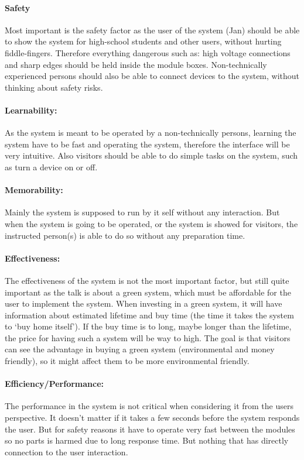 \paragraph{Safety}
Most important is the safety factor as the user of the system (Jan) should be able to show the system for high-school students and other users, without hurting fiddle-fingers. Therefore everything dangerous such as: high voltage connections and sharp edges should be held inside the module boxes.
Non-technically experienced persons should also be able to connect devices to the system, without thinking about safety risks. 
\paragraph{Learnability:}
As the system is meant to be operated by a non-technically persons, learning the system have to be fast and operating the system, therefore the interface will be very intuitive.
Also visitors should be able to do simple tasks on the system, such as turn a device on or off.
\paragraph{Memorability:}
Mainly the system is supposed to run by it self without any interaction. But when the system is going to be operated, or the system is showed for visitors, the instructed person(s) is able to do so without any preparation time.
\paragraph{Effectiveness:}
The effectiveness of the system is not the most important factor, but still quite important as the talk is about a green system, which must be
affordable for the user to implement the system. When investing in a green system, it will have information about estimated lifetime and buy time (the time it takes the system to `buy home itself'). If the buy time is to long, maybe longer than the lifetime, the price for having such a system will be way to high. The goal is that visitors can see the advantage in buying a green system (environmental and money friendly), so it might affect them to be more environmental friendly. 
\paragraph{Efficiency/Performance:}
The performance in the system is not critical when considering it from the users perspective. It doesn't matter if it takes a few seconds before the system responds the user. But for safety reasons it have to operate very fast between the modules so no parts is harmed due to long response time. But nothing that has directly connection to the user interaction.
